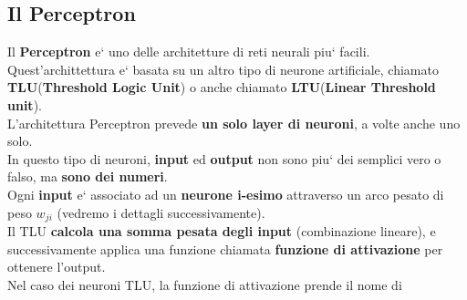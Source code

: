 \subsection{Il Perceptron}
Il \textbf{Perceptron} e` uno delle architetture di reti neurali  piu` facili.
\\
Quest'archittettura e` basata su un altro tipo di neurone artificiale, chiamato 
%
\textbf{TLU}(\textbf{Threshold Logic Unit}) o anche chiamato 
%
\textbf{LTU}(\textbf{Linear Threshold unit}).
\\
L'architettura Perceptron prevede \textbf{un solo layer di neuroni}, a volte 
%
anche uno solo.
\\ 
In questo tipo di neuroni, \textbf{input} ed \textbf{output} non sono piu` dei 
%
semplici vero o falso, ma \textbf{sono dei numeri}.
\\ 
Ogni \textbf{input} e` associato ad un \textbf{neurone i-esimo} attraverso un 
%
arco pesato di peso \(w_{ji}\) (vedremo i dettagli successivamente).
\\ 
Il TLU \textbf{calcola una somma pesata degli input} (combinazione lineare),
%
e successivamente applica una funzione chiamata \textbf{funzione di attivazione}
%
per ottenere l'output.
\\
Nel caso dei neuroni TLU, la funzione di attivazione prende il nome di 

